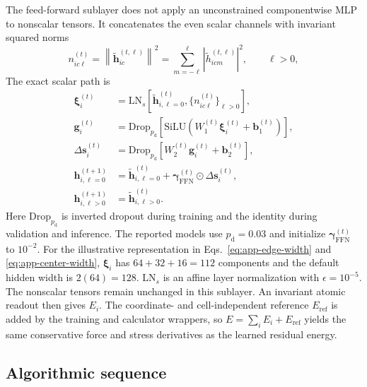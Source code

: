 \documentclass[aps,prx,preprint,notitlepage,superscriptaddress,nofootinbib,floatfix]{revtex4-2}
\newcommand{\vect}[1]{\bm{#1}}
\newif\ifshowrevisions
\newenvironment{draftthirtyoneblock}
  {\ifshowrevisions\color{draftthirtyonecolor}\fi}
  {}
\newenvironment{draftthirtytwoblock}
  {\ifshowrevisions\color{draftthirtytwocolor}\fi}
  {}
\begin{document}
\begin{draftthirtyoneblock}
The feed-forward sublayer does not apply an unconstrained componentwise MLP to
nonscalar tensors. It concatenates the even scalar channels with invariant
squared norms
\begin{equation}
 n_{ic\ell}^{(t)}
 =\left\lVert\widetilde{\vect h}_{ic}^{(t,\ell)}\right\rVert^2
 =\sum_{m=-\ell}^{\ell}
 \left|\widetilde h_{icm}^{(t,\ell)}\right|^2,
 \qquad \ell>0,
 \label{eq:app-tensor-norm}
\end{equation}
\begin{draftthirtytwoblock}
The exact scalar path is
\begin{align}
 \vect\xi_i^{(t)}
 &=\mathrm{LN}_{s}\!\left[
 \widetilde{\vect h}_{i,\ell=0}^{(t)},
 \{n_{ic\ell}^{(t)}\}_{\ell>0}\right],\\
 \vect g_i^{(t)}
 &=\mathrm{Drop}_{p_{\mathrm d}}\!\left[
 \mathrm{SiLU}\!\left(W_1^{(t)}\vect\xi_i^{(t)}+\vect b_1^{(t)}\right)
 \right],\\
 \Delta\vect s_i^{(t)}
 &=\mathrm{Drop}_{p_{\mathrm d}}\!\left[
 W_2^{(t)}\vect g_i^{(t)}+\vect b_2^{(t)}
 \right],\\
 \vect h_{i,\ell=0}^{(t+1)}
 &=\widetilde{\vect h}_{i,\ell=0}^{(t)}
 +\vect\gamma_{\mathrm{FFN}}^{(t)}
 \odot\Delta\vect s_i^{(t)},\\
 \vect h_{i,\ell>0}^{(t+1)}
 &=\widetilde{\vect h}_{i,\ell>0}^{(t)} .
 \label{eq:app-scalar-ffn}
\end{align}
Here \(\mathrm{Drop}_{p_{\mathrm d}}\) is inverted dropout during training and
the identity during validation and inference. The reported models use
\(p_{\mathrm d}=0.03\) and initialize
\(\vect\gamma_{\mathrm{FFN}}^{(t)}\) to \(10^{-2}\). For the illustrative
representation in Eqs.~\eqref{eq:app-edge-width} and
\eqref{eq:app-center-width}, \(\vect\xi_i\) has
\(64+32+16=112\) components and the default hidden width is \(2(64)=128\).
\(\mathrm{LN}_{s}\) is an affine layer normalization with
\(\epsilon=10^{-5}\).
\end{draftthirtytwoblock}
The nonscalar tensors remain unchanged in this sublayer. An invariant atomic
readout then gives \(E_i\). The coordinate- and cell-independent reference
\(E_{\mathrm{ref}}\) is added by the training and calculator wrappers, so
\(E=\sum_iE_i+E_{\mathrm{ref}}\) yields the same conservative force and stress
derivatives as the learned residual energy.

\subsection{Algorithmic sequence}


\end{draftthirtyoneblock}
\end{document}
